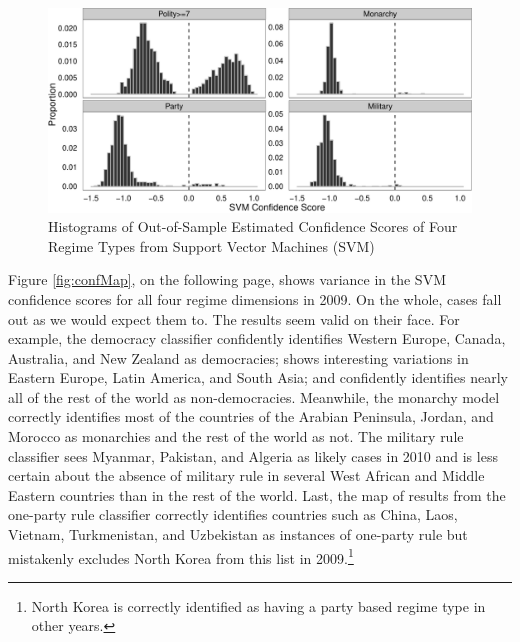 \documentclass[pdftex,12pt,fullpage,oneside]{amsart}
\begin{document}
\begin{figure}[ht]
	\centering
	\includegraphics[width=1\textwidth]{pol_bin_probDist}
	\caption{Histograms of Out-of-Sample Estimated Confidence Scores of Four Regime Types from Support Vector Machines (SVM)}
	\label{fig:confDist}
\end{figure}
\FloatBarrier

Figure \ref{fig:confMap}, on the following page, shows variance in the SVM confidence scores for all four regime dimensions in 2009. On the whole, cases fall out as we would expect them to. The results seem valid on their face. For example, the democracy classifier confidently identifies Western Europe, Canada, Australia, and New Zealand as democracies; shows interesting variations in Eastern Europe, Latin America, and South Asia; and confidently identifies nearly all of the rest of the world as non-democracies. Meanwhile, the monarchy model correctly identifies most of the countries of the Arabian Peninsula, Jordan, and Morocco as monarchies and the rest of the world as not. The military rule classifier sees Myanmar, Pakistan, and Algeria as likely cases in 2010 and is less certain about the absence of military rule in several West African and Middle Eastern countries than in the rest of the world. Last, the map of results from the one-party rule classifier correctly identifies countries such as China, Laos, Vietnam, Turkmenistan, and Uzbekistan as instances of one-party rule but mistakenly excludes North Korea from this list in 2009.\footnote{North Korea is correctly identified as having a party based regime type in other years.} 
\end{document}
